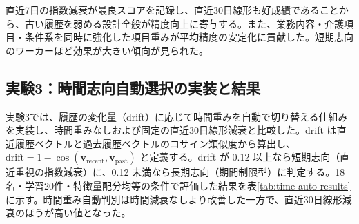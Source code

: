 \documentclass[twocolumn,a4j,dvipdfmx]{jsarticle_customized1}
\begin{document}
 \begin{table}[H]
 \caption{実験2：代表的時間重みによる複合スコア}
 \label{tab:exp2-timeweights}
 \centering
 \end{table}
直近7日の指数減衰が最良スコアを記録し、直近30日線形も好成績であることから、古い履歴を弱める設計全般が精度向上に寄与する。また、業務内容・介護項目・条件系を同時に強化した項目重みが平均精度の安定化に貢献した。短期志向のワーカーほど効果が大きい傾向が見られた。

\subsection{実験3：時間志向自動選択の実装と結果}
実験3では、履歴の変化量（drift）に応じて時間重みを自動で切り替える仕組みを実装し、時間重みなしおよび固定の直近30日線形減衰と比較した。drift は直近履歴ベクトルと過去履歴ベクトルのコサイン類似度から算出し、$ \mathrm{drift}=1-\cos(\bm{v}_{\mathrm{recent}},\bm{v}_{\mathrm{past}})$ と定義する。drift が 0.12 以上なら短期志向（直近重視の指数減衰）に、0.12 未満なら長期志向（期間制限型）に判定する。18名・学習20件・特徴量配分均等の条件で評価した結果を表\ref{tab:time-auto-results}に示す。時間重み自動判別は時間減衰なしより改善した一方で、直近30日線形減衰のほうが高い値となった。
\begin{table}[H]
\caption{時間重み自動判別の実装結果（18名・学習20件）}
\label{tab:time-auto-results}
\centering
{}
\vspace{-0.5em}
\end{table}
\end{document}
